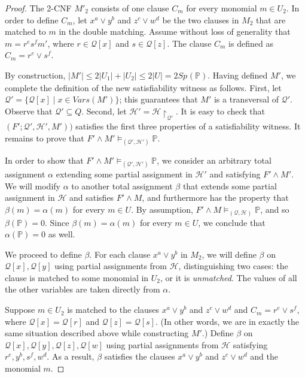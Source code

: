 \documentclass[11pt]{article}
\numberwithin{equation}{section}
\theoremstyle{definition}
\theoremstyle{plain}
\theoremstyle{plain}
\theoremstyle{definition}
\newcommand{\set}[1]{\{ #1 \}}
\newcommand{\setdescr}[3][\mid]{\set{ #2 #1 #3 }}
\newcommand{\setsize}[1]{\lvert#1\rvert}
\newcommand{\polynomialsetformat}[1]{\mathbb{#1}}
\newcommand{\pcsp}{\polynomialsetformat{P}}
\newcommand{\setsofvarsorlit}[2]{\mathit{#1}({#2})}
\newcommand{\vars}[1]{\setsofvarsorlit{Vars}{#1}}
\newcommand{\restrict}[2]{{{#1}\!\!\upharpoonright_{#2}}}
\newcommand{\genericformsmall}[2]{\mathit{#1}( #2 )}
\newcommand{\mspaceof}[2][]{\genericformsmall{Sp_{#1}}{#2}}
\newcommand{\BGmodels}[2]{\models_{(#1,#2)}}
\newcommand{\partialmodels}{\BGmodels{\partitionnot}{\assignmentsetnot}}
\newcommand{\partialmodelsprime}{\BGmodels{\partitionnot'}{\assignmentsetnot'}}
\newcommand{\BGpart}[1]{\partitionnot[#1]}
\newcommand{\satwitness}[1][]{(F';\partitionnot #1, \assignmentsetnot #1, M #1)}
\newcommand{\partitionnot}{\mathcal{Q}}
\newcommand{\assignmentsetnot}{\mathcal{H}}
\begin{document}
\begin{proof}
The 2-CNF $M'_2$ consists of one clause $C_m$ for every monomial $m \in U_2$. In order to define $C_m$, let $x^a \lor y^b$ and $z^c \lor w^d$ be the two clauses in $M_2$ that are matched to $m$ in the double matching. Assume without loss of generality that $m = r^e s^f m'$, where $r \in \BGpart{x}$ and $s \in \BGpart{z}$. The clause $C_m$ is defined as $C_m = r^e \lor s^f$.

By construction, $\setsize{M'} \leq 2\setsize{U_1} + \setsize{U_2} \leq 2\setsize{U} = 2\mspaceof{\pcsp}$. Having defined $M'$, we complete the definition of the new satisfiability witness as follows. First, let $\partitionnot' = \setdescr{\BGpart{x}}{x\in\vars{M'}}$; this guarantees that $M'$ is a transversal of $\partitionnot'$. Observe that $\partitionnot'\subseteq{Q}$. Second, let $\assignmentsetnot'=\restrict{\assignmentsetnot}{\partitionnot'}$. It is easy to check that $\satwitness['])$ satisfies the first three properties of a satisfiability witness. It remains to prove that $F' \land M' \partialmodelsprime \pcsp$.

In order to show that $F'\land M' \partialmodelsprime \pcsp$, we consider an arbitrary total assignment $\alpha$ extending some partial assignment in $\assignmentsetnot'$ and satisfying $F' \land M'$. We will modify $\alpha$ to another total assignment $\beta$ that extends some partial assignment in $\assignmentsetnot$ and satisfies $F' \land M$, and furthermore has the property that $\beta(m) = \alpha(m)$ for every $m \in U$. By assumption, $F' \land M \partialmodels \pcsp$, and so $\beta(\pcsp) = 0$. Since $\beta(m) = \alpha(m)$ for every $m \in U$, we conclude that $\alpha(\pcsp) = 0$ as well.

We proceed to define $\beta$. For each clause $x^a \lor y^b$ in $M_2$, we will define $\beta$ on $\BGpart{x},\BGpart{y}$ using partial assignments from $\assignmentsetnot$, distinguishing two cases: the clause is matched to some monomial in $U_2$, or it is \emph{unmatched}. The values of all the other variables are taken directly from $\alpha$.

Suppose $m \in U_2$ is matched to the clauses $x^a \lor y^b$ and $z^c \lor w^d$ and $C_m = r^e \lor s^f$, where $\BGpart{x} = \BGpart{r}$ and $\BGpart{z} = \BGpart{s}$. (In other words, we are in exactly the same situation described above while constructing $M'$.) Define $\beta$ on $\BGpart{x},\BGpart{y},\BGpart{z},\BGpart{w}$ using partial assignments from $\assignmentsetnot$ satisfying $r^e,y^b,s^f,w^d$. As a result, $\beta$ satisfies the clauses $x^a \lor y^b$ and $z^c \lor w^d$ and the monomial $m$.


\end{proof}
\end{document}
